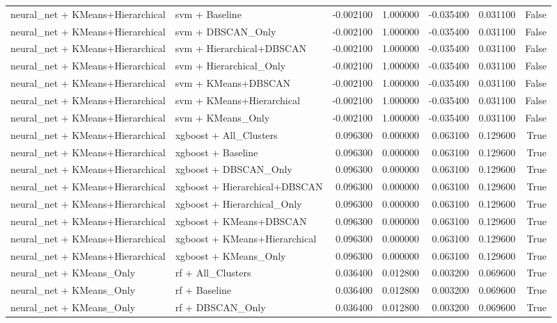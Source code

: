 \begin{tabular}{llrrrrr}
neural_net + KMeans+Hierarchical & svm + Baseline & -0.002100 & 1.000000 & -0.035400 & 0.031100 & False \\
neural_net + KMeans+Hierarchical & svm + DBSCAN_Only & -0.002100 & 1.000000 & -0.035400 & 0.031100 & False \\
neural_net + KMeans+Hierarchical & svm + Hierarchical+DBSCAN & -0.002100 & 1.000000 & -0.035400 & 0.031100 & False \\
neural_net + KMeans+Hierarchical & svm + Hierarchical_Only & -0.002100 & 1.000000 & -0.035400 & 0.031100 & False \\
neural_net + KMeans+Hierarchical & svm + KMeans+DBSCAN & -0.002100 & 1.000000 & -0.035400 & 0.031100 & False \\
neural_net + KMeans+Hierarchical & svm + KMeans+Hierarchical & -0.002100 & 1.000000 & -0.035400 & 0.031100 & False \\
neural_net + KMeans+Hierarchical & svm + KMeans_Only & -0.002100 & 1.000000 & -0.035400 & 0.031100 & False \\
neural_net + KMeans+Hierarchical & xgboost + All_Clusters & 0.096300 & 0.000000 & 0.063100 & 0.129600 & True \\
neural_net + KMeans+Hierarchical & xgboost + Baseline & 0.096300 & 0.000000 & 0.063100 & 0.129600 & True \\
neural_net + KMeans+Hierarchical & xgboost + DBSCAN_Only & 0.096300 & 0.000000 & 0.063100 & 0.129600 & True \\
neural_net + KMeans+Hierarchical & xgboost + Hierarchical+DBSCAN & 0.096300 & 0.000000 & 0.063100 & 0.129600 & True \\
neural_net + KMeans+Hierarchical & xgboost + Hierarchical_Only & 0.096300 & 0.000000 & 0.063100 & 0.129600 & True \\
neural_net + KMeans+Hierarchical & xgboost + KMeans+DBSCAN & 0.096300 & 0.000000 & 0.063100 & 0.129600 & True \\
neural_net + KMeans+Hierarchical & xgboost + KMeans+Hierarchical & 0.096300 & 0.000000 & 0.063100 & 0.129600 & True \\
neural_net + KMeans+Hierarchical & xgboost + KMeans_Only & 0.096300 & 0.000000 & 0.063100 & 0.129600 & True \\
neural_net + KMeans_Only & rf + All_Clusters & 0.036400 & 0.012800 & 0.003200 & 0.069600 & True \\
neural_net + KMeans_Only & rf + Baseline & 0.036400 & 0.012800 & 0.003200 & 0.069600 & True \\
neural_net + KMeans_Only & rf + DBSCAN_Only & 0.036400 & 0.012800 & 0.003200 & 0.069600 & True \\

\end{tabular}

